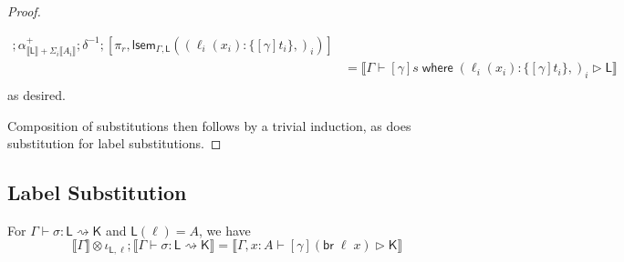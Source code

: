 \documentclass[acmsmall,screen,review]{acmart}
\newcommand{\ms}[1]{\ensuremath{\mathsf{#1}}}
\newcommand{\lto}{:}
\newcommand{\brb}[2]{\ms{br}\;#1\;#2}
\newcommand{\where}[2]{#1\;\ms{where}\;#2}
\newcommand{\wbranch}[3]{#1(#2) \lto \{#3\}}
\newcommand{\haslb}[3]{#1 \vdash #2 \rhd #3}
\newcommand{\lbsubst}[4]{#1 \vdash #2: #3 \rightsquigarrow #4}
\newcommand{\dnt}[1]{\llbracket{#1}\rrbracket}
\newcommand{\loopmor}[3]{\ms{lsem}_{#1, #3}(#2)}
\begin{document}
\begin{proof}
\begin{itemize}[leftmargin=*]
\begin{equation}
\begin{aligned}
{            ; \alpha^+_{\dnt{\ms{L}} + \Sigma_i \dnt{A_i}}}
          ; \delta^{-1}
          ; [\pi_r, \loopmor{\Gamma}{(\wbranch{\ell_i}{x_i}{[\gamma]t_i},)_i}{\ms{L}}] \\
        & = \dnt{\haslb{\Gamma}
          {\where{[\gamma]s}
          {(\wbranch{\ell_i}{x_i}{[\gamma]t_i},)_i}}{\ms{L}}} \\
      \end{aligned}
    \end{equation}
    as desired.
  \end{itemize}
  Composition of substitutions then follows by a trivial induction, as does substitution for label
  substitutions.
\end{proof}

\subsection{Label Substitution}

\begin{lemma}
  For $\lbsubst{\Gamma}{\sigma}{\ms{L}}{\ms{K}}$ and $\ms{L}(\ell) = A$, we have
  \begin{equation}
    \dnt{\Gamma} \otimes \iota_{\ms{L}, \ell} ; \dnt{\lbsubst{\Gamma}{\sigma}{\ms{L}}{\ms{K}}}
    = \dnt{\haslb{\Gamma, x : A}{[\gamma](\brb{\ell}{x})}{\ms{K}}}
  \end{equation}
  \label{lem:lsubst-inj}
\end{lemma}
\end{document}
